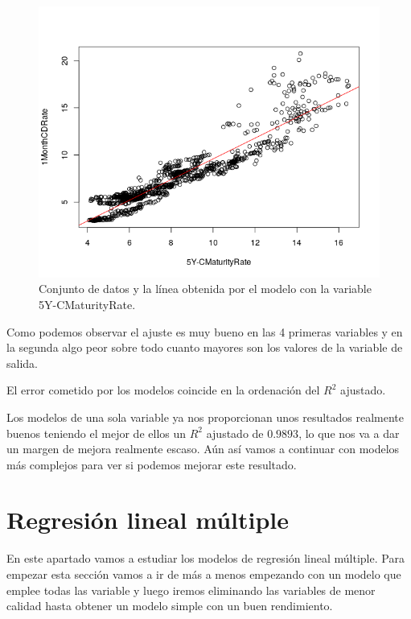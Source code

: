 \documentclass[12pt,a4paper]{article}
\begin{document}
\begin{figure}[H]
	\centering 
	\includegraphics[scale=0.65]{./Imagenes/Regresion/abline_5Y_CMaturityRate.png}
	\caption{Conjunto de datos y la línea obtenida por el modelo con la variable 5Y-CMaturityRate.}
\end{figure}

Como podemos observar el ajuste es muy bueno en las 4 primeras variables y en la segunda algo peor sobre todo cuanto mayores son los valores de la variable de salida.

El error cometido por los modelos coincide en la ordenación del $R^2$ ajustado.

Los modelos de una sola variable ya nos proporcionan unos resultados realmente buenos teniendo el mejor de ellos un $R^2$ ajustado de $0.9893$, lo que nos va a dar un margen de mejora realmente escaso. Aún así vamos a continuar con modelos más complejos para ver si podemos mejorar este resultado.

\section{Regresión lineal múltiple}

En este apartado vamos a estudiar los modelos de regresión lineal múltiple. Para empezar esta sección vamos a ir de más a menos empezando con un modelo que emplee todas las variable y luego iremos eliminando las variables de menor calidad hasta obtener un modelo simple con un buen rendimiento.
\end{document}
